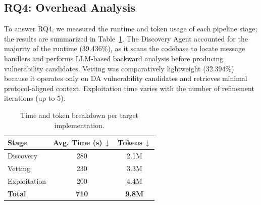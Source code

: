 \subsection{RQ4: Overhead Analysis}


To answer RQ4, we measured the runtime and token usage of each pipeline stage; the results are summarized in Table~\ref{tab:performance}.
The Discovery Agent accounted for the majority of the runtime (39.436\%), as it scans the codebase to locate message handlers and performs LLM-based backward analysis before producing vulnerability candidates. Vetting was comparatively lightweight (32.394\%) because it operates only on DA vulnerability candidates and retrieves minimal protocol-aligned context. Exploitation time varies with the number of refinement iterations (up to 5). 


\begin{table}[ht]
  \centering
  \caption{Time and token breakdown per target implementation.}
  \small
  \begin{tabular}{@{}lcc@{}}
    \toprule
    \textbf{Stage} & \textbf{Avg. Time (s)\,$\downarrow$} & \textbf{Tokens\,$\downarrow$} \\
    \midrule
    Discovery     & 280  & 2.1M \\
    Vetting       & 230  & 3.3M \\
    Exploitation  & 200  & 4.4M \\
    \midrule
    \textbf{Total} & \textbf{710} & \textbf{9.8M} \\
    \bottomrule
  \end{tabular}
  \label{tab:performance}
\end{table}



